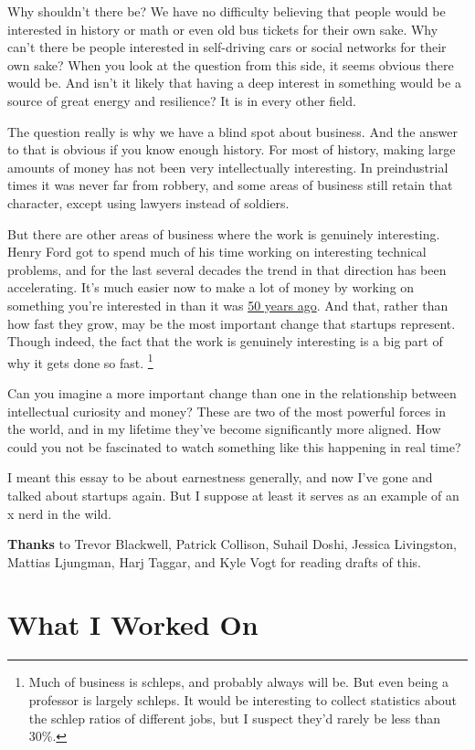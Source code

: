 \documentclass[12pt]{book}
\begin{document}
Why shouldn't there be? We have no difficulty believing that people
would be interested in history or math or even old bus tickets for their
own sake. Why can't there be people interested in self-driving cars or
social networks for their own sake? When you look at the question from
this side, it seems obvious there would be. And isn't it likely that
having a deep interest in something would be a source of great energy
and resilience? It is in every other field.

The question really is why we have a blind spot about business. And the
answer to that is obvious if you know enough history. For most of
history, making large amounts of money has not been very intellectually
interesting. In preindustrial times it was never far from robbery, and
some areas of business still retain that character, except using lawyers
instead of soldiers.

But there are other areas of business where the work is genuinely
interesting. Henry Ford got to spend much of his time working on
interesting technical problems, and for the last several decades the
trend in that direction has been accelerating. It's much easier now to
make a lot of money by working on something you're interested in than it
was \href{re.html}{50 years ago}. And that, rather than how fast they
grow, may be the most important change that startups represent. Though
indeed, the fact that the work is genuinely interesting is a big part of
why it gets done so fast. \footnote{Much of business is schleps, and probably always will be. But
even being a professor is largely schleps. It would be interesting to
collect statistics about the schlep ratios of different jobs, but I
suspect they'd rarely be less than 30\%.}

Can you imagine a more important change than one in the relationship
between intellectual curiosity and money? These are two of the most
powerful forces in the world, and in my lifetime they've become
significantly more aligned. How could you not be fascinated to watch
something like this happening in real time?

I meant this essay to be about earnestness generally, and now I've gone
and talked about startups again. But I suppose at least it serves as an
example of an x nerd in the wild.


\textbf{Thanks} to Trevor Blackwell, Patrick Collison, Suhail Doshi,
Jessica Livingston, Mattias Ljungman, Harj Taggar, and Kyle Vogt for
reading drafts of this.
\chapter{What I Worked On}
\end{document}
